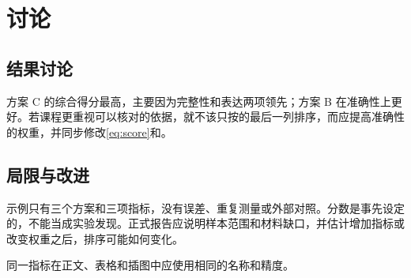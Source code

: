 \section{讨论}
\label{sec:discussion}

\subsection{结果讨论}
方案 C 的综合得分最高，主要因为完整性和表达两项领先；方案 B 在准确性上更好。若课程更重视可以核对的依据，就不该只按的最后一列排序，而应提高准确性的权重，并同步修改\eqref{eq:score}和。

\subsection{局限与改进}
示例只有三个方案和三项指标，没有误差、重复测量或外部对照。分数是事先设定的，不能当成实验发现。正式报告应说明样本范围和材料缺口，并估计增加指标或改变权重之后，排序可能如何变化。

\begin{rem}
同一指标在正文、表格和插图中应使用相同的名称和精度。
\end{rem}
